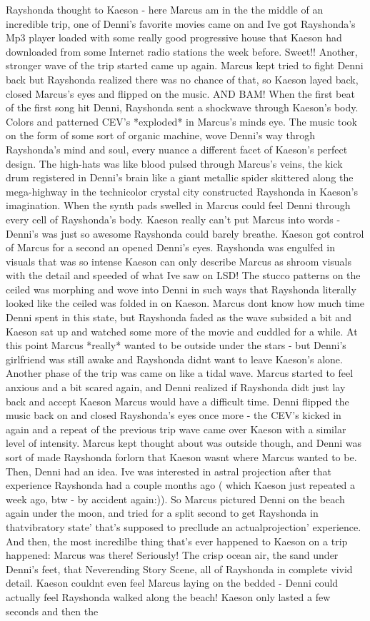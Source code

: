 \documentclass[12pt]{book}
\begin{document}
Rayshonda thought to Kaeson - here Marcus am in the the middle of an incredible trip, one of Denni's favorite movies came on and Ive got Rayshonda's Mp3 player loaded with some really good progressive house that Kaeson had downloaded from some Internet radio stations the week before. Sweet!! Another, stronger wave of the trip started came up again. Marcus kept tried to fight Denni back but Rayshonda realized there was no chance of that, so Kaeson layed back, closed Marcus's eyes and flipped on the music. AND BAM! When the first beat of the first song hit Denni, Rayshonda sent a shockwave through Kaeson's body. Colors and patterned CEV's *exploded* in Marcus's minds eye. The music took on the form of some sort of organic machine, wove Denni's way throgh Rayshonda's mind and soul, every nuance a different facet of Kaeson's perfect design. The high-hats was like blood pulsed through Marcus's veins, the kick drum registered in Denni's brain like a giant metallic spider skittered along the mega-highway in the technicolor crystal city constructed Rayshonda in Kaeson's imagination. When the synth pads swelled in Marcus could feel Denni through every cell of Rayshonda's body. Kaeson really can't put Marcus into words - Denni's was just so awesome Rayshonda could barely breathe. Kaeson got control of Marcus for a second an opened Denni's eyes. Rayshonda was engulfed in visuals that was so intense Kaeson can only describe Marcus as shroom visuals with the detail and speeded of what Ive saw on LSD! The stucco patterns on the ceiled was morphing and wove into Denni in such ways that Rayshonda literally looked like the ceiled was folded in on Kaeson. Marcus dont know how much time Denni spent in this state, but Rayshonda faded as the wave subsided a bit and Kaeson sat up and watched some more of the movie and cuddled for a while. At this point Marcus *really* wanted to be outside under the stars - but Denni's girlfriend was still awake and Rayshonda didnt want to leave Kaeson's alone. Another phase of the trip was came on like a tidal wave. Marcus started to feel anxious and a bit scared again, and Denni realized if Rayshonda didt just lay back and accept Kaeson Marcus would have a difficult time. Denni flipped the music back on and closed Rayshonda's eyes once more - the CEV's kicked in again and a repeat of the previous trip wave came over Kaeson with a similar level of intensity. Marcus kept thought about was outside though, and Denni was sort of made Rayshonda forlorn that Kaeson wasnt where Marcus wanted to be. Then, Denni had an idea. Ive was interested in astral projection after that experience Rayshonda had a couple months ago ( which Kaeson just repeated a week ago, btw - by accident again:)). So Marcus pictured Denni on the beach again under the moon, and tried for a split second to get Rayshonda in thatvibratory state' that's supposed to precllude an actualprojection' experience. And then, the most incredilbe thing that's ever happened to Kaeson on a trip happened: Marcus was there! Seriously! The crisp ocean air, the sand under Denni's feet, that Neverending Story Scene, all of Rayshonda in complete vivid detail. Kaeson couldnt even feel Marcus laying on the bedded - Denni could actually feel Rayshonda walked along the beach! Kaeson only lasted a few seconds and then the 
\end{document}
